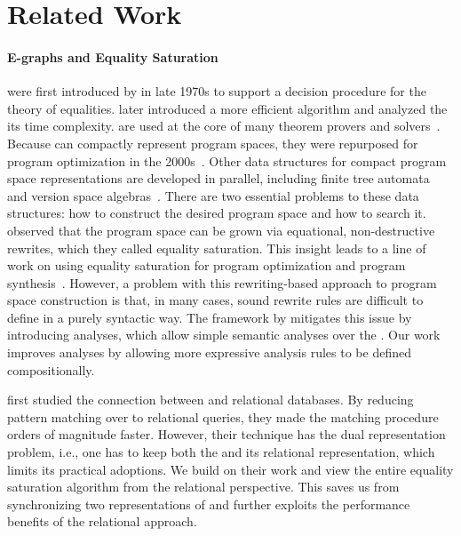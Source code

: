 \section{Related Work}

\paragraph{E-graphs and Equality Saturation}
\Egraphs were first introduced by \citet{nelson}
 in late 1970s 
 to support a decision procedure for the theory of equalities.
\citet{tarjan-congruence} later introduced
 a more efficient algorithm
 and analyzed the its time complexity.
\Egraphs are used at the core of 
 many theorem provers and solvers~\citep{simplify, z3, cvc4}.
Because \egraphs can compactly represent program spaces,
 they were repurposed for program optimization in the 2000s~\citep{eqsat,denali}.
Other data structures for compact program space representations are developed in parallel,
 including finite tree automata~\citep{dace,blaze} and version space algebras~\citep{vsa,flashmeta}.
There are two essential problems to these data structures:
 how to construct the desired program space and how to search it.
\citet{eqsat} observed that 
 the program space can be grown via equational, non-destructive rewrites, 
 which they called equality saturation.
This insight
 leads to a line of work on using equality saturation 
 for program optimization and program synthesis~\citep{herbie,ruler,tensat,spores,diospyros,szalinski}.
However, 
 a problem with this rewriting-based approach to program space construction is that,
 in many cases,
 sound rewrite rules are difficult to define in a purely syntactic way.
The \egg framework by \citet{egg} mitigates this issue 
 by introducing \eclass analyses, 
 which allow simple semantic analyses over the \egraphs.
Our work improves \eclass analyses 
 by allowing more expressive analysis rules to be defined
 compositionally.

\citet{relational-ematching} first studied 
 the connection between \egraphs and relational databases.
By reducing pattern matching over \egraphs to relational queries,
 they made the matching procedure orders of magnitude faster.
However, their technique has the dual representation problem, 
 i.e., one has to keep both the \egraph and its relational representation, 
 which limits its practical adoptions.
We build on their work
 and view the entire equality saturation algorithm from the relational perspective.
This saves us from synchronizing two representations of \egraphs
 and further exploits the performance benefits of the relational approach.

